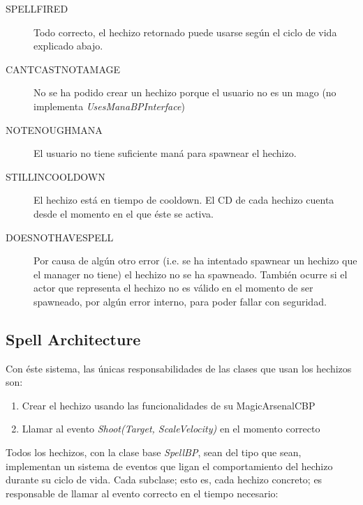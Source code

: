 \documentclass[12pt]{report}
\begin{document}
\begin{description}
	\item[SPELL\textunderscore FIRED] Todo correcto, el hechizo retornado puede usarse según el ciclo de vida explicado abajo.
	\item[CANT\textunderscore CAST\textunderscore NOT\textunderscore A\textunderscore MAGE] No se ha podido crear un hechizo porque el usuario no es un mago (no implementa \textit{\emph{UsesManaBPInterface}})
	\item[NOT\textunderscore ENOUGH\textunderscore MANA] El usuario no tiene suficiente maná para spawnear el hechizo.
	\item[STILL\textunderscore IN\textunderscore COOLDOWN] El hechizo está en tiempo de cooldown. El CD de cada hechizo cuenta desde el momento en el que éste se activa.
	\item[DOES\textunderscore NOT\textunderscore HAVE\textunderscore SPELL] Por causa de algún otro error (i.e. se ha intentado spawnear un hechizo que el manager no tiene) el hechizo no se ha spawneado. También ocurre si el actor que representa el hechizo no es válido en el momento de ser spawneado, por algún error interno, para poder fallar con seguridad.
\end{description}

\subsection{Spell Architecture}

Con éste sistema, las únicas responsabilidades de las clases que usan los hechizos son:

\begin{enumerate}
	\item Crear el hechizo usando las funcionalidades de su MagicArsenalCBP
	\item Llamar al evento \textit{Shoot(Target, ScaleVelocity)} en el momento correcto
\end{enumerate}

Todos los hechizos, con la clase base \textit{\emph{SpellBP}}, sean del tipo que sean, implementan un sistema de eventos que ligan el comportamiento del hechizo durante su ciclo de vida. Cada subclase; esto es, cada hechizo concreto; es responsable de llamar al evento correcto en el tiempo necesario:
\end{document}
